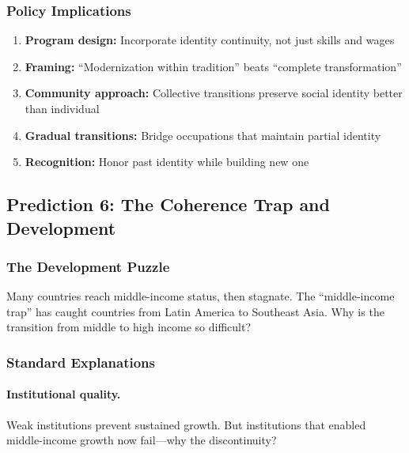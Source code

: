 \subsubsection{Policy Implications}

\begin{enumerate}
  \item \textbf{Program design:} Incorporate identity continuity, not just skills and wages
  \item \textbf{Framing:} ``Modernization within tradition'' beats ``complete transformation''
  \item \textbf{Community approach:} Collective transitions preserve social identity better than individual
  \item \textbf{Gradual transitions:} Bridge occupations that maintain partial identity
  \item \textbf{Recognition:} Honor past identity while building new one
\end{enumerate}

\subsection{Prediction 6: The Coherence Trap and Development}
\label{subsec:pred-coherence-trap}

\subsubsection{The Development Puzzle}

Many countries reach middle-income status, then stagnate. The ``middle-income 
trap'' has caught countries from Latin America to Southeast Asia. Why is 
the transition from middle to high income so difficult?

\subsubsection{Standard Explanations}

\paragraph{Institutional quality.} Weak institutions prevent sustained growth.
But institutions that enabled middle-income growth now fail---why the discontinuity?

